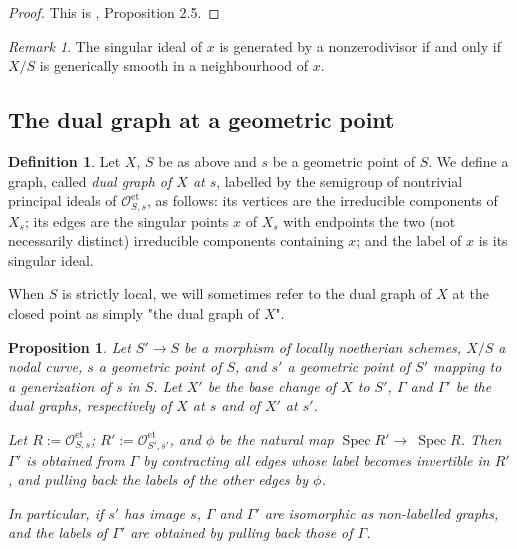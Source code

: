 \documentclass[a4paper,10pt,twoside]{article}
\newcommand{\ra}{\rightarrow}
\newcommand{\on}[1]{\operatorname{#1}}
\renewcommand{\O}{\mathcal{O}}
\DeclareMathOperator{\spec}{Spec}
\newtheorem{prop}[thm]{Proposition}
\theoremstyle{definition}
\newtheorem{defi}[thm]{Definition}
\theoremstyle{remark}
\newtheorem{rem}{Remark}[thm]
\renewcommand{\on}[1]{\operatorname{#1}}
\begin{document}
\begin{proof}
	This is \cite{Holmes}, Proposition 2.5.
\end{proof}

\begin{rem}
The singular ideal of $x$ is generated by a nonzerodivisor if and only if $X/S$ is generically smooth in a neighbourhood of $x$.
\end{rem}


\subsection{The dual graph at a geometric point}

\begin{defi}\label{definition:dual_graph}
	Let $X$, $S$ be as above and $s$ be a geometric point of $S$. We define a graph, called \emph{dual graph of $X$ at $s$}, labelled by the semigroup of nontrivial principal ideals of $\O^{\on{et}}_{S,s}$, as follows: its vertices are the irreducible components of $X_s$; its edges are the singular points $x$ of $X_s$ with endpoints the two (not necessarily distinct) irreducible components containing $x$; and the label of $x$ is its singular ideal.
	
When $S$ is strictly local, we will sometimes refer to the dual graph of $X$ at the closed point as simply "the dual graph of $X$".
\end{defi}


\begin{prop}\label{graphes duaux et changement de base}
	Let $S'\ra S$ be a morphism of locally noetherian schemes, $X/S$ a nodal curve, $s$ a geometric point of $S$, and $s'$ a geometric point of $S'$ mapping to a generization of $s$ in $S$. Let $X'$ be the base change of $X$ to $S'$, $\Gamma$ and $\Gamma'$ be the dual graphs, respectively of $X$ at $s$ and of $X'$ at $s'$.
	
	Let $R:=\O^{\on{et}}_{S,s}$; $R':=\O^{\on{et}}_{S',s'}$, and $\phi$ be the natural map $\spec R'\ra~\spec R$. Then $\Gamma'$ is obtained from $\Gamma$ by contracting all edges whose label becomes invertible in $R'$, and pulling back the labels of the other edges by $\phi$.
	
	In particular, if $s'$ has image $s$, $\Gamma$ and $\Gamma'$ are isomorphic as non-labelled graphs, and the labels of $\Gamma'$ are obtained by pulling back those of $\Gamma$.
\end{prop}
\end{document}
